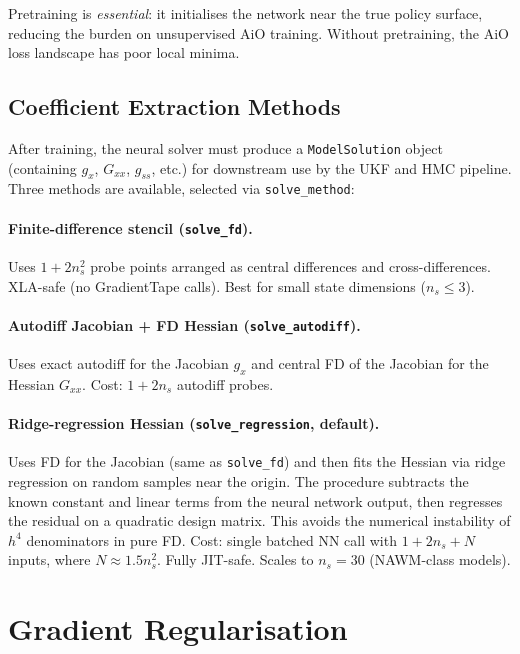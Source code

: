 \documentclass[11pt,a4paper]{article}
\theoremstyle{definition}
\newcommand{\code}[1]{\texttt{\color{codecolor}#1}}
\begin{document}
	Pretraining is \emph{essential}: it initialises the network near the true policy surface, reducing the burden on unsupervised AiO training.
	Without pretraining, the AiO loss landscape has poor local minima.
	
	\subsection{Coefficient Extraction Methods}
	\label{sec:coeff_extract}
	
	After training, the neural solver must produce a \code{ModelSolution} object (containing $g_x$, $G_{xx}$, $g_{ss}$, etc.) for downstream use by the UKF and HMC pipeline.
	Three methods are available, selected via \code{solve\_method}:
	
	\paragraph{Finite-difference stencil (\code{solve\_fd}).}
	Uses $1 + 2n_s^2$ probe points arranged as central differences and cross-differences.
	XLA-safe (no GradientTape calls).
	Best for small state dimensions ($n_s \leq 3$).
	
	\paragraph{Autodiff Jacobian + FD Hessian (\code{solve\_autodiff}).}
	Uses exact autodiff for the Jacobian $g_x$ and central FD of the Jacobian for the Hessian $G_{xx}$.
	Cost: $1 + 2n_s$ autodiff probes.
	
	\paragraph{Ridge-regression Hessian (\code{solve\_regression}, default).}
	Uses FD for the Jacobian (same as \code{solve\_fd}) and then fits the Hessian via ridge regression on random samples near the origin.
	The procedure subtracts the known constant and linear terms from the neural network output, then regresses the residual on a quadratic design matrix.
	This avoids the numerical instability of $h^4$ denominators in pure FD.
	Cost: single batched NN call with $1 + 2n_s + N$ inputs, where $N \approx 1.5 n_s^2$.
	Fully JIT-safe.
	Scales to $n_s = 30$ (NAWM-class models).
	
	
	\section{Gradient Regularisation}
	\label{sec:regularisation}
	
\end{document}
